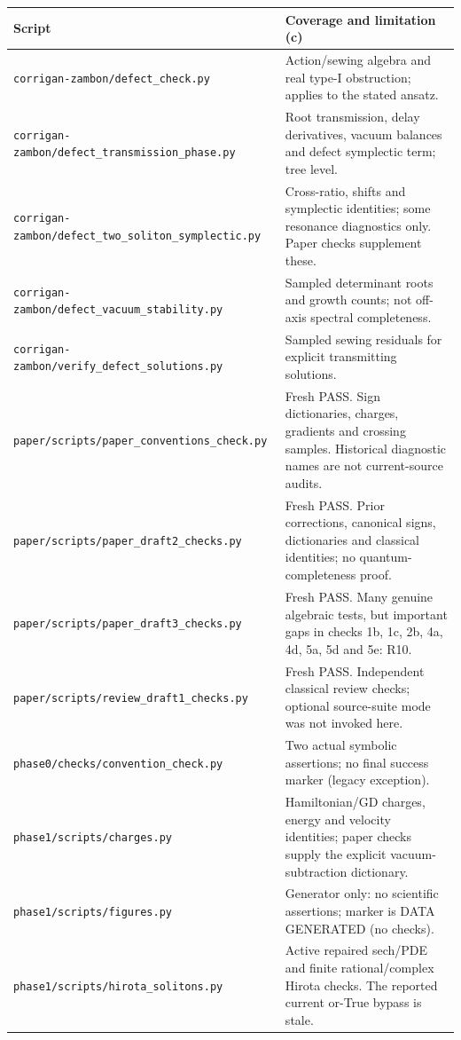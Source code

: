 \documentclass[11pt,a4paper]{article}
\newcommand{\file}[1]{\nolinkurl{#1}}
\begin{document}
\small
\begin{longtable}{@{}L{6.0cm}L{9.2cm}@{}}
\toprule Script & Coverage and limitation (c)\\\midrule\endhead
\file{corrigan-zambon/defect_check.py} & Action/sewing algebra and real type-I obstruction; applies to the stated ansatz.\\
\file{corrigan-zambon/defect_transmission_phase.py} & Root transmission, delay derivatives, vacuum balances and defect symplectic term; tree level.\\
\file{corrigan-zambon/defect_two_soliton_symplectic.py} & Cross-ratio, shifts and symplectic identities; some resonance diagnostics only. Paper checks supplement these.\\
\file{corrigan-zambon/defect_vacuum_stability.py} & Sampled determinant roots and growth counts; not off-axis spectral completeness.\\
\file{corrigan-zambon/verify_defect_solutions.py} & Sampled sewing residuals for explicit transmitting solutions.\\
\file{paper/scripts/paper_conventions_check.py} & Fresh PASS. Sign dictionaries, charges, gradients and crossing samples. Historical diagnostic names are not current-source audits.\\
\file{paper/scripts/paper_draft2_checks.py} & Fresh PASS. Prior corrections, canonical signs, dictionaries and classical identities; no quantum-completeness proof.\\
\file{paper/scripts/paper_draft3_checks.py} & Fresh PASS. Many genuine algebraic tests, but important gaps in checks 1b, 1c, 2b, 4a, 4d, 5a, 5d and 5e: R10.\\
\file{paper/scripts/review_draft1_checks.py} & Fresh PASS. Independent classical review checks; optional source-suite mode was not invoked here.\\
\file{phase0/checks/convention_check.py} & Two actual symbolic assertions; no final success marker (legacy exception).\\
\file{phase1/scripts/charges.py} & Hamiltonian/GD charges, energy and velocity identities; paper checks supply the explicit vacuum-subtraction dictionary.\\
\file{phase1/scripts/figures.py} & Generator only: no scientific assertions; marker is DATA GENERATED (no checks).\\
\file{phase1/scripts/hirota_solitons.py} & Active repaired sech/PDE and finite rational/complex Hirota checks. The reported current or-True bypass is stale.\\

\end{longtable}
\end{document}
